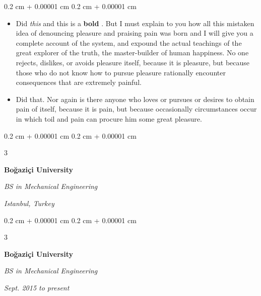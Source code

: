 \documentclass[10pt, letterpaper]{article}
\newenvironment{highlights}{
    \begin{itemize}[
        topsep=0.10 cm,
        parsep=0.10 cm,
        partopsep=0pt,
        itemsep=0pt,
        leftmargin=0.4 cm + 10pt + 0.6 cm
    ]
}{
    \end{itemize}
} %
\newenvironment{onecolentry}{
    \begin{adjustwidth}{
        0.2 cm + 0.00001 cm
    }{
        0.2 cm + 0.00001 cm
    }
}{
    \end{adjustwidth}
} %
\newenvironment{threecolentry}[3][]{
    \onecolentry
    \def\thirdColumn{#3}
    \setcolumnwidth{0.6 cm, \fill, 4.5 cm}
    \begin{paracol}{3}
    #2 \switchcolumn
}{
    \switchcolumn \raggedleft \thirdColumn
    \end{paracol}
    \endonecolentry
} %
\let\hrefWithoutArrow\href
\renewcommand{\href}[2]{\hrefWithoutArrow{#1}{\mbox{\ifthenelse{\equal{#2}{}}{ }{#2 }\raisebox{.15ex}{\footnotesize \faExternalLink*}}}}
\begin{document}
        \vspace{0.10 cm-3px}
        \begin{onecolentry}
            \begin{highlights}
                \item Did \textit{this} and this is a \textbf{bold} \href{https://example.com}{link}. But I must explain to you how all this mistaken idea of denouncing pleasure and praising pain was born and I will give you a complete account of the system, and expound the actual teachings of the great explorer of the truth, the master-builder of human happiness. No one rejects, dislikes, or avoids pleasure itself, because it is pleasure, but because those who do not know how to pursue pleasure rationally encounter consequences that are extremely painful.
                \item Did that. Nor again is there anyone who loves or pursues or desires to obtain pain of itself, because it is pain, but because occasionally circumstances occur in which toil and pain can procure him some great pleasure.
            \end{highlights}
        \end{onecolentry}


        \vspace{0.2 cm-3px}

        \begin{threecolentry}{
            \vspace*{\fill}
            \textbullet
            \vspace*{3px}
            \vspace*{\fill}
        }{
        \textit{Istanbul, Turkey}    
            
        }
            \textbf{Boğaziçi University}

            \textit{BS in Mechanical Engineering}
        \end{threecolentry}



        \vspace{0.2 cm-3px}

        \begin{threecolentry}{
            \vspace*{\fill}
            \textbullet
            \vspace*{3px}
            \vspace*{\fill}
        }{
            
            
        \textit{Sept. 2015 to present}}
            \textbf{Boğaziçi University}

            \textit{BS in Mechanical Engineering}
        \end{threecolentry}
\end{document}
